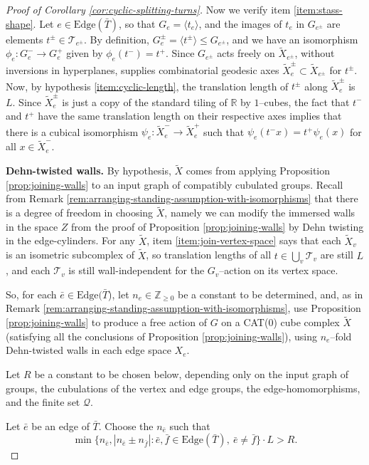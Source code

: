 \documentclass[11pt,oneside]{amsart}
\newcounter{ax}
\theoremstyle{definition}
\newcommand{\field}[1]{\mathbb{#1}}
\newcommand{\integers}{\ensuremath{\field{Z}}}
\newcommand{\reals}{\ensuremath{\field{R}}}
\newcommand{\edges}{\mathrm{Edge}}
\begin{document}
\begin{proof}[Proof of Corollary \ref{cor:cyclic-splitting-turns}]
Now we verify item \eqref{item:stass-shape}.  Let $e\in\edges(\bar T)$, so that $G_e=\langle t_e\rangle$, and the images of $t_e$ in $G_{e^{\pm}}$ are elements $t^\pm\in \mathcal T_{e^\pm}$.  By definition, $G_{e}^\pm=\langle t^\pm\rangle\leq G_{e^\pm}$, and we have an isomorphism $\phi_e:G_e^-\to G_e^+$ given by $\phi_e(t^-)=t^+$.  Since $G_{e^\pm}$ acts freely on $\widetilde X_{e^\pm}$, without inversions in hyperplanes, \cite{Haglund:semisimple} supplies combinatorial geodesic axes $\widetilde X_e^\pm\subset\widetilde X_{e^\pm}$ for $t^\pm$.  Now, by hypothesis \eqref{item:cyclic-length}, the translation length of $t^\pm$ along $\widetilde X_e^\pm$ is $L$.  Since $\widetilde X_e^\pm$ is just a copy of the standard tiling of $\reals$ by $1$--cubes, the fact that $t^-$ and $t^+$ have the same translation length on their respective axes implies that there is a cubical isomorphism $\psi_e:\widetilde X_e^-\to\widetilde X_e^+$ such that $\psi_e(t^-x)=t^+\psi_e(x)$ for all $x\in\widetilde X_e^-$.

\textbf{Dehn-twisted walls.}  By hypothesis, $\widetilde X$ comes from applying Proposition \ref{prop:joining-walls} to an input graph of compatibly cubulated groups.  Recall from Remark \ref{rem:arranging-standing-assumption-with-isomorphisms} that there is a degree of freedom in choosing $\widetilde X$, namely we can modify the immersed walls in the space $Z$ from the proof of Proposition \ref{prop:joining-walls} by Dehn twisting in the edge-cylinders.  For any $\widetilde X$, item \eqref{item:join-vertex-space} says that each $\widetilde X_v$ is an isometric subcomplex of $\widetilde X$,  so translation lengths of all $t\in\bigcup_v\mathcal T_v$ are still $L$, and each $\mathcal T_v$ is still wall-independent for the $G_v$--action on its vertex space.

So, for each $\bar e\in\edges(\bar T$), let $n_e\in\integers_{\ge0}$ be a constant to be determined, and, as in Remark \ref{rem:arranging-standing-assumption-with-isomorphisms}, use Proposition \ref{prop:joining-walls} to produce a free action of $G$ on a CAT(0) cube complex $\widetilde X$ (satisfying all the conclusions of Proposition \ref{prop:joining-walls}), using $n_e$--fold Dehn-twisted walls in each edge space $X_e$.

Let $R$ be a constant to be chosen below, depending only on the input graph of groups, the cubulations of the vertex and edge groups, the edge-homomorphisms, and the finite set $\mathcal Q$.

Let $\bar e$ be an edge of $\bar T$.  Choose the $n_{\bar e}$ such that
$$\min\{n_{\bar e}, |n_{\bar e}\pm n_{\bar f}|:\bar e,\bar f\in\edges(\bar T),\ \bar e\neq \bar f\}\cdot L>R.$$


\end{proof}
\end{document}

